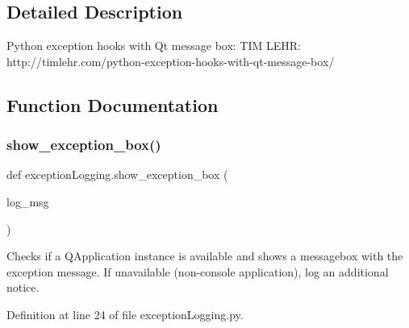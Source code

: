 \subsection{Detailed Description}
\begin{DoxyVerb}Python exception hooks with Qt message box:
TIM LEHR: http://timlehr.com/python-exception-hooks-with-qt-message-box/
\end{DoxyVerb}
 

\subsection{Function Documentation}
\mbox{\label{namespaceexception_logging_a344573aa6a56cab1c4b1679a08589ada}} 
\subsubsection{\texorpdfstring{show\_exception\_box()}{show\_exception\_box()}}
{\footnotesize\ttfamily def exception\+Logging.\+show\+\_\+exception\+\_\+box (\begin{DoxyParamCaption}\item[{}]{log\+\_\+msg }\end{DoxyParamCaption})}

\begin{DoxyVerb}Checks if a QApplication instance is available and shows a messagebox with the exception message. 
If unavailable (non-console application), log an additional notice.
\end{DoxyVerb}
 

Definition at line 24 of file exception\+Logging.\+py.


